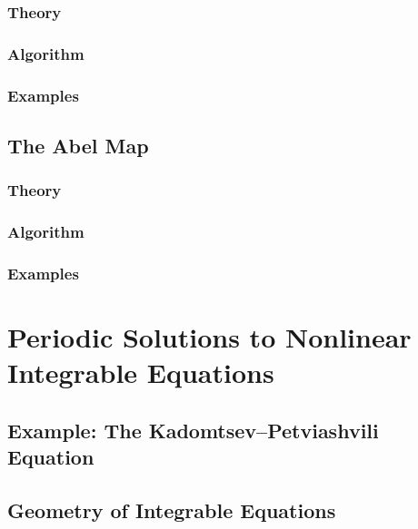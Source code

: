 \documentclass[10pt,twoside]{article}
\numberwithin{equation}{section}
\begin{document}
%
\subsubsection*{Theory}
%
%
\subsubsection*{Algorithm}
%
%
\subsubsection*{Examples}
%

\subsection{The Abel Map}

%
\subsubsection*{Theory}
%
%
\subsubsection*{Algorithm}
%
%
\subsubsection*{Examples}
%

\section{Periodic Solutions to Nonlinear Integrable Equations}

\subsection{Example: The Kadomtsev--Petviashvili Equation}

\subsection{Geometry of Integrable Equations}
\end{document}
